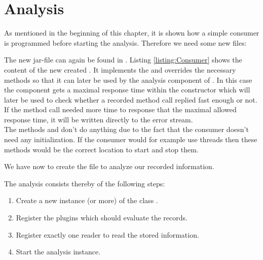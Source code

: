 \section{Analysis}\label{sec:example:analysis}
As mentioned in the beginning of this chapter, it is shown how a simple consumer is programmed before starting the analysis. Therefore we need some new files:
\begin{figure}[H]
\begin{graybox}
\end{graybox}
\end{figure}

The new jar-file can again be found in . Listing \ref{listing:Consumer} shows the content of the new created . It implements the  and overrides the necessary methods so that it can later be used by the analysis component of \Kieker. In this case the component gets a maximal response time within the constructor which will later be used to check whether a recorded method call replied fast enough or not. If the method call needed more time to response that the maximal allowed response time, it will be written directly to the error stream.\\
The methods  and  don't do anything due to the fact that the consumer doesn't need any initialization. If the consumer would for example use threads then these methods would be the correct location to start and stop them.

\setJavaCodeListing       


We have now to create the file  to analyze our recorded information. 

\notify The analysis consists thereby of the following steps:
\begin{enumerate}
\item Create a new instance (or more) of the class .
\item Register the plugins which should evaluate the records.
\item Register exactly one reader to read the stored information.
\item Start the analysis instance.
\end{enumerate}

